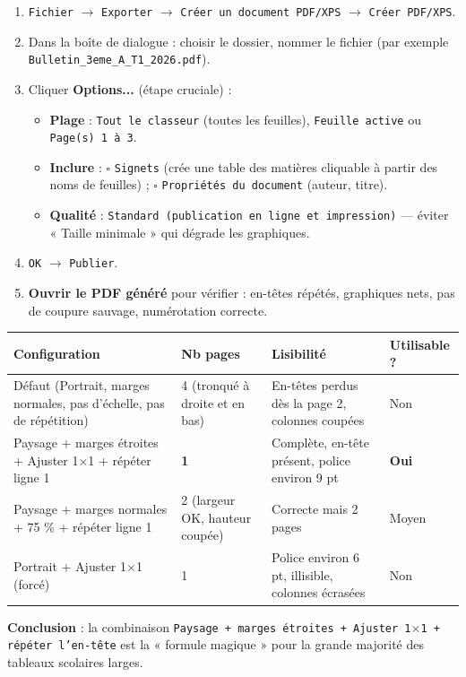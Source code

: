 \documentclass[11pt]{article}
\begin{document}
\begin{methode}
\begin{enumerate}
  \item \texttt{Fichier} $\rightarrow$ \texttt{Exporter} $\rightarrow$ \texttt{Créer un document PDF/XPS} $\rightarrow$ \texttt{Créer PDF/XPS}.
  \item Dans la boîte de dialogue : choisir le dossier, nommer le fichier (par exemple \texttt{Bulletin\_3eme\_A\_T1\_2026.pdf}).
  \item Cliquer \textbf{Options...} (étape cruciale) :
    \begin{itemize}
      \item \textbf{Plage} : \texttt{Tout le classeur} (toutes les feuilles), \texttt{Feuille active} ou \texttt{Page(s) 1 à 3}.
      \item \textbf{Inclure} : $\square$ \texttt{Signets} (crée une table des matières cliquable à partir des noms de feuilles) ; $\square$ \texttt{Propriétés du document} (auteur, titre).
      \item \textbf{Qualité} : \texttt{Standard (publication en ligne et impression)} — éviter « Taille minimale » qui dégrade les graphiques.
    \end{itemize}
  \item \texttt{OK} $\rightarrow$ \texttt{Publier}.
  \item \textbf{Ouvrir le PDF généré} pour vérifier : en-têtes répétés, graphiques nets, pas de coupure sauvage, numérotation correcte.
\end{enumerate}
\end{methode}

\begin{exemplebox}
\begin{center}
\begin{tabularx}{\linewidth}{|X|l|X|l|}
\hline
\rowcolor{popblueL}
\textbf{Configuration} & \textbf{Nb pages} & \textbf{Lisibilité} & \textbf{Utilisable ?} \\
\hline
Défaut (Portrait, marges normales, pas d'échelle, pas de répétition) & 4 (tronqué à droite et en bas) & En-têtes perdus dès la page 2, colonnes coupées & \textcolor{poporange}{Non} \\
\hline
Paysage + marges étroites + Ajuster 1$\times$1 + répéter ligne 1 & \textbf{1} & Complète, en-tête présent, police environ 9 pt & \textcolor{popgreen}{\textbf{Oui}} \\
\hline
Paysage + marges normales + 75 \% + répéter ligne 1 & 2 (largeur OK, hauteur coupée) & Correcte mais 2 pages & \textcolor{poporange}{Moyen} \\
\hline
Portrait + Ajuster 1$\times$1 (forcé) & 1 & Police environ 6 pt, illisible, colonnes écrasées & \textcolor{poporange}{Non} \\
\hline
\end{tabularx}
\end{center}
\textbf{Conclusion} : la combinaison \texttt{Paysage + marges étroites + Ajuster 1$\times$1 + répéter l'en-tête} est la « formule magique » pour la grande majorité des tableaux scolaires larges.
\end{exemplebox}
\end{document}
